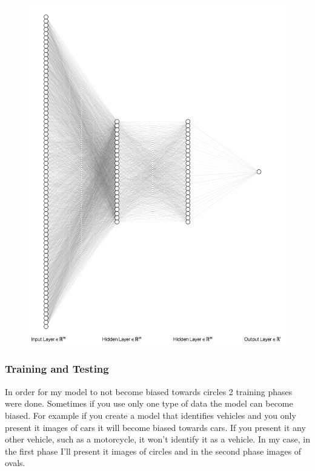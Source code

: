 \documentclass[9pt,onecolumn,oneside]{osajnl}
\begin{document}
    \begin{figure}[h]
  \centering
  \begin{minipage}[b]{0.6\textwidth}
  	\centering
    \includegraphics[width=\textwidth]{nn.png}
  \end{minipage}
\end{figure}
  
    
    
\subsubsection{Training and Testing}  

	In order for my model to not become biased towards circles 2 training phases were done. Sometimes if you use only one type of data the model can become biased. For example if you create a model that identifies vehicles and you only present it images of cars it will become biased towards cars. If you present it any other vehicle, such as a motorcycle, it won't identify it as a vehicle. In my case, in the first phase I'll present it images of circles and in the second phase images of ovals.\\
\end{document}
